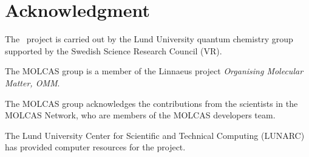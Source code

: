 
\section{Acknowledgment}

The \molcas\ project is carried out by the Lund University quantum chemistry
group supported by the Swedish Science Research Council (VR).

The MOLCAS group is a member of the Linnaeus project {\em Organising Molecular
Matter, OMM}.

The MOLCAS group acknowledges the contributions from the scientists in the
MOLCAS Network, who are members of the MOLCAS developers team.

The Lund University Center for Scientific and Technical Computing (LUNARC) has
provided computer resources for the project.

